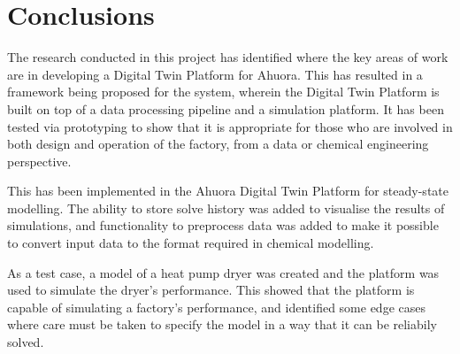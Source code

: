 \chapter{Conclusions}






The research conducted in this project has identified where the key areas of work are in developing a Digital Twin Platform for Ahuora. 
This has resulted in a framework being proposed for the system, wherein the Digital Twin Platform is built on top of a data processing pipeline and a simulation platform. 
It has been tested via prototyping to show that it is appropriate for those who are involved in both design and operation of the factory, from a data or chemical engineering perspective.


This has been implemented in the Ahuora Digital Twin Platform for steady-state modelling. 
The ability to store solve history was added to visualise the results of simulations, and functionality to preprocess data was added to make it possible to convert input data to the format required in chemical modelling. 

As a test case, a model of a heat pump dryer was created and the platform was used to simulate the dryer's performance. 
This showed that the platform is capable of simulating a factory's performance, and identified some edge cases where care must be taken to specify the model in a way that it can be reliabily solved.


